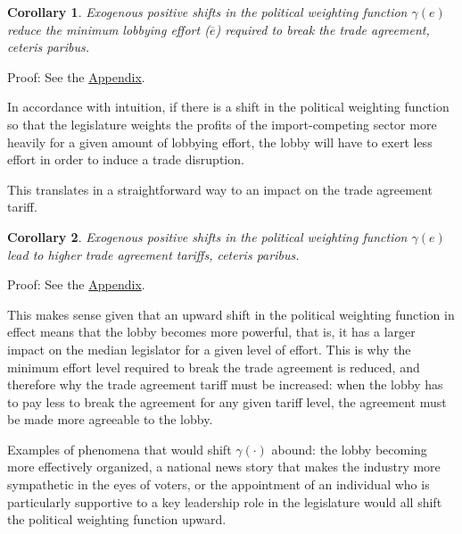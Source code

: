 \documentclass[authoryear, review]{elsarticle}
\newtheorem{corollary}{Corollary}
\newcommand{\ov}{\overline}
\newcommand{\ga}{\gamma}
\begin{document}
\begin{corollary}
  \label{cor:eg}
  Exogenous positive shifts in the political weighting function $\ga(e)$ reduce the minimum lobbying effort ($\ov{e}$) required to break the trade agreement, \emph{ceteris paribus}.

\end{corollary}

Proof: See the \hyperlink{Cor_eg}{Appendix}.

\noindent In accordance with intuition, if there is a shift in the political weighting function so that the legislature weights the profits of the import-competing sector more heavily for a given amount of lobbying effort, the lobby will have to exert less effort in order to induce a trade disruption.

This translates in a straightforward way to an impact on the trade agreement tariff.

\begin{corollary}
  Exogenous positive shifts in the political weighting function $\ga(e)$ lead to higher trade agreement tariffs, \emph{ceteris paribus}.
  \label{cor:tg}
\end{corollary}

Proof: See the \hyperlink{Cor_tg}{Appendix}.

\noindent This makes sense given that an upward shift in the political weighting function in effect means that the lobby becomes more powerful, that is, it has a larger impact on the median legislator for a given level of effort. This is why the minimum effort level required to break the trade agreement is reduced, and therefore why the trade agreement tariff must be increased: when the lobby has to pay less to break the agreement for any given tariff level, the agreement must be made more agreeable to the lobby.

Examples of phenomena that would shift $\ga(\cdot)$ abound: the lobby becoming more effectively organized, a national news story that makes the industry more sympathetic in the eyes of voters, or the appointment of an individual who is particularly supportive to a key leadership role in the legislature would all shift the political weighting function upward.
\end{document}
